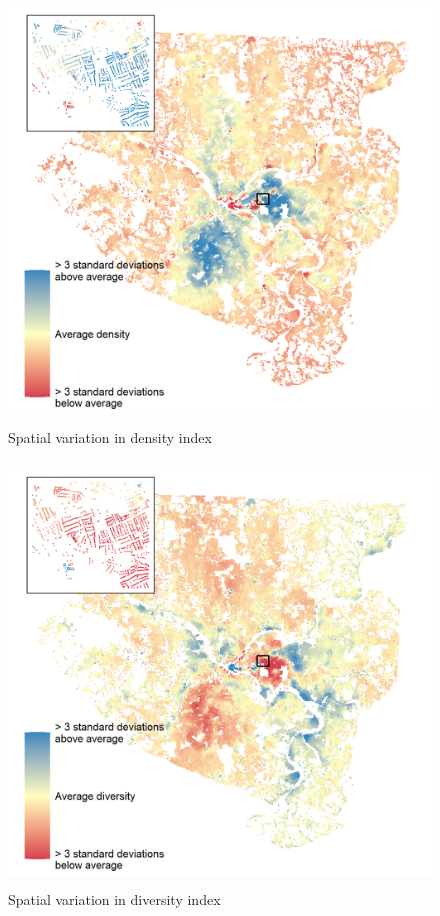\documentclass[
]{book}
\begin{document}
\begin{figure}
\includegraphics[width=1\linewidth]{04_figures/dense} \caption{Spatial variation in density index}\label{fig:dense-map}
\end{figure}

\begin{figure}
\includegraphics[width=1\linewidth]{04_figures/diverse} \caption{Spatial variation in diversity index}\label{fig:diverse-map}
\end{figure}
\end{document}
